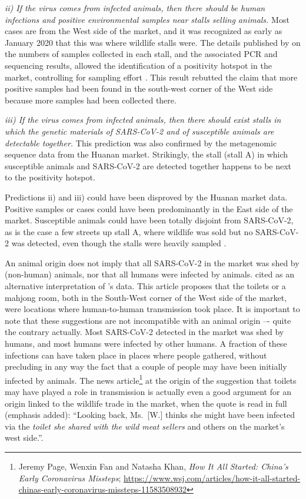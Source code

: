 \documentclass[11pt]{article}
\def \sct {\mbox{SARS-CoV-2}}
\begin{document}
\textit{ii) If the virus comes from infected animals, then there should be human infections and positive environmental samples near stalls selling animals.} 
Most cases are from the West side of the market, and it was recognized as early as January 2020 that this was where wildlife stalls were. The details published by \citet{Liu2023Nature} on the numbers of samples collected in each stall, and the associated PCR and sequencing results, allowed the identification of a positivity hotspot in the market, controlling for sampling effort \citep{ACC2023bioRxiv}. This result rebutted the claim that more positive samples had been found in the south-west corner of the West side because more samples had been collected there.

\textit{iii) If the virus comes from infected animals, then there should exist stalls in which the genetic materials of SARS-CoV-2 and of susceptible animals are detectable together.} 
This prediction was also confirmed by the metagenomic sequence data from the Huanan market. Strikingly, the stall (stall A) in which susceptible animals and \sct{} are detected together happens to be next to the positivity hotspot. 

Predictions ii) and iii) could have been disproved by the Huanan market data. Positive samples or cases could have been predominantly in the East side of the market. Susceptible animals could have been totally disjoint from \sct{}, as is the case a few streets up stall A, where wildlife was sold but no \sct{} was detected, even though the stalls were heavily sampled \citep{Liu2023Nature, ACC2023bioRxiv}.

An animal origin does not imply that all \sct{} in the market was shed by (non-human) animals, nor that all humans were infected by animals.  cited \citep{CORibera2022ER} as an alternative interpretation of \citet{Liu2022RS}'s data. This article proposes that the toilets or a mahjong room, both in the South-West corner of the West side of the market, were locations where human-to-human transmission took place. It is important to note that these suggestions are not incompatible with an animal origin –- quite the contrary actually. Most \sct{} detected in the market was shed by humans, and most humans were infected by other humans. A fraction of these infections can have taken place in places where people gathered, without precluding in any way the fact that a couple of people may have been initially infected by animals. The news article\footnote{ 
Jeremy Page, Wenxin Fan and Natasha Khan, \textit{How It All Started: China’s Early Coronavirus Missteps}; \url{https://www.wsj.com/articles/how-it-all-started-chinas-early-coronavirus-missteps-11583508932}} at the origin of the suggestion that toilets may have played a role in transmission is actually even a good argument for an origin linked to the wildlife trade in the market, when the quote is read in full (emphasis added): ``Looking back, Ms.\ [W.] thinks she might have been infected via the \textit{toilet she shared with the wild meat sellers} and others on the market's west side.''.
\end{document}
